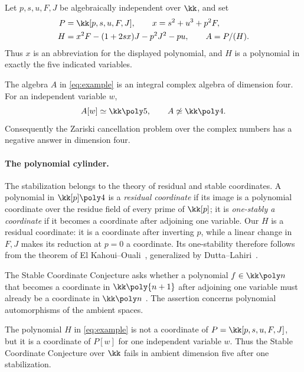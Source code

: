 Let $p,s,u,F,J$ be algebraically independent over $\kk$, and set
\begin{equation}
 \begin{split}
 P&=\kk[p,s,u,F,J],\qquad x=s^2+u^3+p^2F,\\
 H&=x^2F-(1+2sx)J-p^2J^2-pu,\qquad A=P/(H).
 \end{split}
 \label{eq:example}
\end{equation}
Thus $x$ is an abbreviation for the displayed polynomial, and $H$ is a
polynomial in exactly the five indicated variables.

\begin{theorem}
\label{thm:main}
The algebra $A$ in \eqref{eq:example} is an integral complex algebra of
dimension four. For an independent variable $w$,
\[
 A[w]\simeq\kk\poly5,
 \qquad
 A\not\simeq\kk\poly4.
\]
Consequently the Zariski cancellation problem over the complex numbers has
a negative answer in dimension four.
\end{theorem}

\paragraph{The polynomial cylinder.}
The stabilization belongs to the theory of residual and stable
coordinates. A polynomial in $\kk[p]\poly4$ is a \emph{residual
coordinate} if its image is a polynomial coordinate over the residue
field of every prime of $\kk[p]$; it is \emph{one-stably a coordinate}
if it becomes a coordinate after adjoining one variable. Our $H$ is a
residual coordinate: it is a coordinate after inverting $p$, while a
linear change in $F,J$ makes its reduction at $p=0$ a coordinate.
Its one-stability therefore follows from the theorem of
El Kahoui--Ouali~\cite[Theorem~1.1]{ElKahouiOuali}, generalized by
Dutta--Lahiri~\cite[Theorem~3.4]{DuttaLahiri}.

The Stable Coordinate Conjecture asks whether a polynomial
$f\in\kk\poly n$ that becomes a coordinate in $\kk\poly{n+1}$ after
adjoining one variable must already be a coordinate in $\kk\poly n$
\cite[p.~342]{MakarLimanovVanRossumShpilrainYu}. The assertion concerns
polynomial automorphisms of the ambient spaces.

\begin{corollary}
\label{cor:stable-coordinate}
The polynomial $H$ in \eqref{eq:example} is not a coordinate of
$P=\kk[p,s,u,F,J]$, but it is a coordinate of $P[w]$ for one independent
variable $w$. Thus the Stable Coordinate Conjecture over $\kk$ fails in
ambient dimension five after one stabilization.
\end{corollary}
